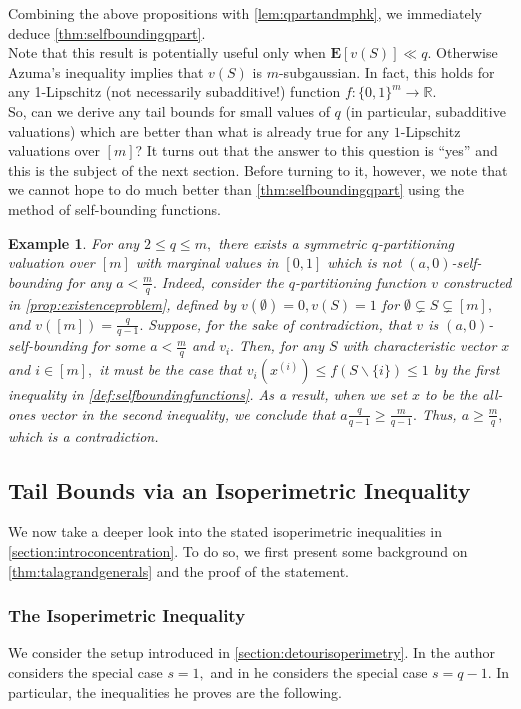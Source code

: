 \documentclass[11pt]{article}%
\newtheorem{example}[theorem]{Example}
\numberwithin{theorem}{subsection}
\newcommand{\expect}{\mathbf{E}}
\begin{document}
\noindent
Combining the above propositions with \cref{lem:qpartandmphk}, we immediately deduce \cref{thm:selfboundingqpart}.\\

\noindent
Note that this result is potentially useful only when $\expect[v(S)] \ll q.$ Otherwise Azuma's inequality \cite{Azuma} implies that $v(S)$ is $m$-subgaussian. In fact, this holds for any 1-Lipschitz (not necessarily subadditive!) function $f:\{0,1\}^m\longrightarrow \mathbb{R}.$\\

\noindent
So, can we derive any tail bounds for
small values of $q$ (in particular, subadditive valuations) which are better than what is already true for any $1$-Lipschitz valuations over $[m]$? It turns out that the answer to this question is ``yes'' and this is the subject of the next section. Before turning to it, however, we note that we cannot hope to do much better than \cref{thm:selfboundingqpart}
using the method of self-bounding functions.

\begin{example}
\normalfont
For any $2\le q\le m,$ there exists a symmetric $q$-partitioning valuation over $[m]$ with marginal values in $[0,1]$ which is not $(a,0)$-self-bounding for any $a<\frac{m}{q}.$ Indeed, consider the $q$-partitioning function $v$ constructed in \cref{prop:existenceproblem}, defined by $v(\emptyset) = 0, v(S) = 1$ for $\emptyset \subsetneq S\subsetneq [m],$ and 
$v([m]) = \frac{q}{q-1}.$ Suppose, for the sake of contradiction, that $v$ is $(a,0)$-self-bounding for some $a<\frac{m}{q}$ and $v_i.$
Then, for any $S$ with characteristic vector $x$ and $i\in [m],$ it must be the case that $v_i(x^{(i)})\le f(S\backslash \{i\}) \le 1$ by the first inequality in \cref{def:selfboundingfunctions}. As a result, when we set $x$ to be the all-ones vector in the second inequality, we conclude that $a\frac{q}{q-1}\ge \frac{m}{q-1}.$ Thus, $a\ge \frac{m}{q},$ which is a contradiction.
\end{example}

\subsection{Tail Bounds via an Isoperimetric Inequality}
We now 
take a deeper look into the stated isoperimetric inequalities in \cref{section:introconcentration}. To do so, we first present some background on
\cref{thm:talagrandgenerals} and the proof of the statement. 
\subsubsection{The Isoperimetric Inequality}
We consider the setup introduced in \cref{section:detourisoperimetry}.
In \cite[Section 3.1.1]{Talagrand01} the author considers the special case $s = 1,$ and in \cite[Section 5.7]{Talagrand96} he considers the special case $s = q-1.$ In particular, the inequalities he proves are the following.
\end{document}
